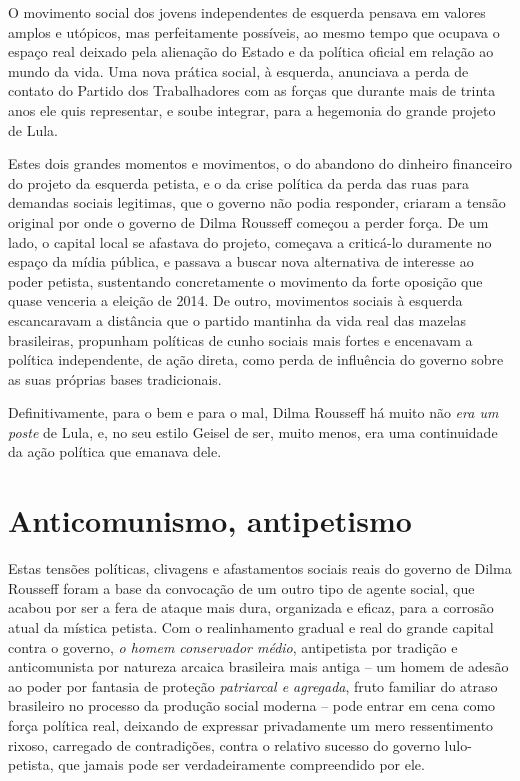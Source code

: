 O movimento social dos jovens independentes de esquerda pensava em
valores amplos e utópicos, mas perfeitamente possíveis, ao mesmo tempo
que ocupava o espaço real deixado pela alienação do Estado e da política
oficial em relação ao mundo da vida. Uma nova prática social, à
esquerda, anunciava a perda de contato do Partido dos Trabalhadores com
as forças que durante mais de trinta anos ele quis representar, e soube
integrar, para a hegemonia do grande projeto de Lula.

Estes dois grandes momentos e movimentos, o do abandono do dinheiro
financeiro do projeto da esquerda petista, e o da crise política da
perda das ruas para demandas sociais legitimas, que o governo não podia
responder, criaram a tensão original por onde o governo de Dilma
Rousseff começou a perder força. De um lado, o capital local se afastava
do projeto, começava a criticá-lo duramente no espaço da mídia pública,
e passava a buscar nova alternativa de interesse ao poder petista,
sustentando concretamente o movimento da forte oposição que quase
venceria a eleição de 2014. De outro, movimentos sociais à esquerda
escancaravam a distância que o partido mantinha da vida real das mazelas
brasileiras, propunham políticas de cunho sociais mais fortes e
encenavam a política independente, de ação direta, como perda de
influência do governo sobre as suas próprias bases tradicionais.

Definitivamente, para o bem e para o mal, Dilma Rousseff há muito não
\emph{era um poste} de Lula, e, no seu estilo Geisel de ser, muito
menos, era uma continuidade da ação política que emanava dele.

  \section{Anticomunismo, antipetismo}\label{anticomunismo-antipetismo}

Estas tensões políticas, clivagens e afastamentos sociais reais do
governo de Dilma Rousseff foram a base da convocação de um outro tipo de
agente social, que acabou por ser a fera de ataque mais dura, organizada
e eficaz, para a corrosão atual da mística petista. Com o realinhamento
gradual e real do grande capital contra o governo, \emph{o homem
conservador médio}, antipetista por tradição e anticomunista por
natureza arcaica brasileira mais antiga -- um homem de adesão ao poder
por fantasia de proteção \emph{patriarcal e agregada}, fruto familiar do
atraso brasileiro no processo da produção social moderna -- pode entrar
em cena como força política real, deixando de expressar privadamente um
mero ressentimento rixoso, carregado de contradições, contra o relativo
sucesso do governo lulo-petista, que jamais pode ser verdadeiramente
compreendido por ele.

